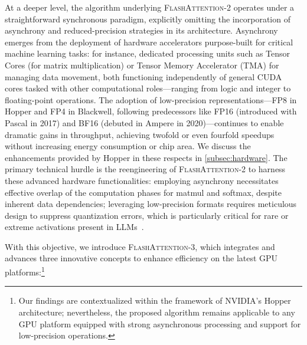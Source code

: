 At a deeper level, the algorithm underlying \textsc{FlashAttention-2} operates under a straightforward synchronous paradigm, explicitly omitting the incorporation of asynchrony and reduced-precision strategies in its architecture. Asynchrony emerges from the deployment of hardware accelerators purpose-built for critical machine learning tasks: for instance, dedicated processing units such as Tensor Cores (for matrix multiplication) or Tensor Memory Accelerator (TMA) for managing data movement, both functioning independently of general CUDA cores tasked with other computational roles—ranging from logic and integer to floating-point operations. The adoption of low-precision representations—FP8 in Hopper and FP4 in Blackwell, following predecessors like FP16 (introduced with Pascal in 2017) and BF16 (debuted in Ampere in 2020)—continues to enable dramatic gains in throughput, achieving twofold or even fourfold speedups without increasing energy consumption or chip area. We discuss the enhancements provided by Hopper in these respects in \cref{subsec:hardware}.  
The primary technical hurdle is the reengineering of \textsc{FlashAttention-2} to harness these advanced hardware functionalities: employing asynchrony necessitates effective overlap of the computation phases for matmul and softmax, despite inherent data dependencies; leveraging low-precision formats requires meticulous design to suppress quantization errors, which is particularly critical for rare or extreme activations present in LLMs~\citep{dettmers2208llm, sun2024massive}.

With this objective, we introduce \textsc{FlashAttention-3}, which integrates and advances three innovative concepts to enhance efficiency on the latest GPU platforms:\footnote{Our findings are contextualized within the framework of NVIDIA’s Hopper architecture; nevertheless, the proposed algorithm remains applicable to any GPU platform equipped with strong asynchronous processing and support for low-precision operations.}

